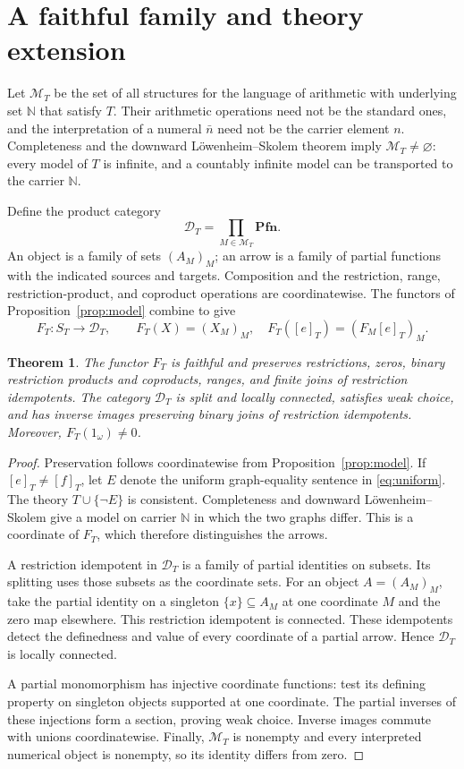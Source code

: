 \documentclass[11pt]{article}
\newtheorem{theorem}{Theorem}[section]
\newcommand{\N}{\mathbb N}
\newcommand{\Pfn}{\mathbf{Pfn}}
\begin{document}
\section{A faithful family and theory extension}\label{sec:family}

Let $\mathcal M_T$ be the set of all structures for the language of
arithmetic with underlying set $\N$ that satisfy $T$. Their arithmetic
operations need not be the standard ones, and the interpretation of a
numeral $\bar n$ need not be the carrier element $n$. Completeness and
the downward L\"owenheim--Skolem theorem imply
$\mathcal M_T\ne\varnothing$: every model of $T$ is infinite, and a
countably infinite model can be transported to the carrier $\N$.

Define the product category
\[
 \mathcal D_T=\prod_{M\in\mathcal M_T}\Pfn.
\]
An object is a family of sets $(A_M)_M$; an arrow is a family of partial
functions with the indicated sources and targets. Composition and the
restriction, range, restriction-product, and coproduct operations are coordinatewise.
The functors of Proposition~\ref{prop:model} combine to give
\[
 F_T:S_T\longrightarrow\mathcal D_T,\qquad
 F_T(X)=(X_M)_M,\quad F_T([e]_T)=(F_M[e]_T)_M.
\]

\begin{theorem}\label{thm:faithful}
The functor $F_T$ is faithful and preserves restrictions, zeros, binary
restriction products and coproducts, ranges, and finite joins of
restriction idempotents. The category
$\mathcal D_T$ is split and locally connected, satisfies weak choice,
and has inverse images preserving binary joins of restriction
idempotents. Moreover,
$F_T(1_\omega)\ne0$.
\end{theorem}
\begin{proof}
Preservation follows coordinatewise from Proposition~\ref{prop:model}.
If $[e]_T\ne[f]_T$, let $E$ denote the uniform graph-equality sentence
in \eqref{eq:uniform}. The theory $T\cup\{\neg E\}$ is consistent.
Completeness and downward L\"owenheim--Skolem give a model on carrier
$\N$ in which the two graphs differ. This is a coordinate of $F_T$,
which therefore distinguishes the arrows.

A restriction idempotent in $\mathcal D_T$ is a family of partial
identities on subsets. Its splitting uses those subsets as the
coordinate sets. For an object $A=(A_M)_M$, take the partial identity
on a singleton $\{x\}\subseteq A_M$ at one coordinate $M$ and the zero
map elsewhere. This restriction idempotent is connected. These
idempotents detect the definedness and value of every coordinate of a partial arrow. Hence
$\mathcal D_T$ is locally connected.

A partial monomorphism has injective coordinate functions: test its
defining property on singleton objects supported at one coordinate.
The partial inverses of these injections form a section, proving weak
choice. Inverse images commute with unions coordinatewise. Finally,
$\mathcal M_T$ is nonempty and every interpreted numerical object is
nonempty, so its identity differs from zero.
\end{proof}
\end{document}
